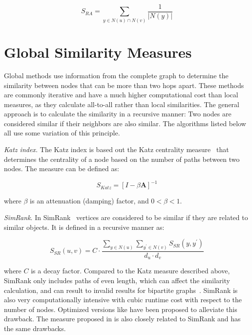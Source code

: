 \begin{equation}
S_{RA} = \sum_{y \in N(u) \cap N(v)}{\frac{1}{|N(y)|}}
\end{equation}

\section{Global Similarity Measures}

Global methods use information from the complete graph to determine the
similarity between nodes that can be more than two hops apart. These methods
are commonly iterative and have a much higher computational cost than local
measures, as they calculate all-to-all rather than local similarities.
The general approach is to calculate the similarity in a recursive manner:
Two nodes are considered similar if their neighbors are also similar.
The algorithms listed below all use some variation of this principle.

\emph{Katz index.} The Katz index \cite{vertex-similarity-survey} is based out the Katz centrality
measure~\cite{katz-index} that determines the centrality of a node
based on the number of paths between two nodes. The measure can be
defined as:

\begin{equation}
	S_{Katz} = [I - \beta \mathbf{A}]^{-1}
\end{equation}

\noindent
where $\beta$ is an attenuation (damping) factor, and $0 < \beta < 1$.

\emph{SimRank}. In SimRank~\cite{simrank} vertices are considered
to be similar if they are related to similar objects. It is defined
in a recursive manner as:

\begin{equation}
	S_{SR}(u, v)= C \cdot \frac{\sum_{y \in N(u)} \sum_{y^{\prime} \in N(v)} S_{SR}(y, y^{\prime})}{d_{u} \cdot d_{v}}
\end{equation}

\noindent
where $C$ is a decay factor. Compared to the Katz measure described above,
SimRank only includes paths of even length, which can affect the similarity
calculation, and can result to invalid results
for bipartite graphs~\cite{vertex-similarity-survey}. SimRank is also very computationally intensive with cubic
runtime cost with respect to the number of nodes. Optimized versions like
\cite{simrankOpt} have been proposed to alleviate this drawback.
The measure proposed in \citet{blondel-similarity} is also closely related to SimRank
and has the same drawbacks.

